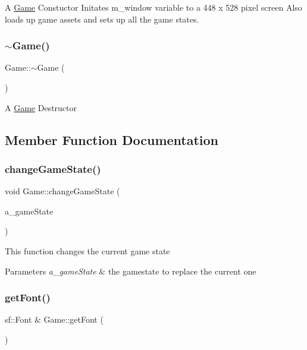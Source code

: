 A \hyperlink{class_game}{Game} Constuctor Initates m\+\_\+window variable to a 448 x 528 pixel screen Also loads up game assets and sets up all the game states. \mbox{\label{class_game_ae3d112ca6e0e55150d2fdbc704474530}} 
\subsubsection{\texorpdfstring{$\sim$\+Game()}{~Game()}}
{\footnotesize\ttfamily Game\+::$\sim$\+Game (\begin{DoxyParamCaption}{ }\end{DoxyParamCaption})}

A \hyperlink{class_game}{Game} Destructor 

\subsection{Member Function Documentation}
\mbox{\label{class_game_aead31c173174cd4251542403a9e1e111}} 
\subsubsection{\texorpdfstring{change\+Game\+State()}{changeGameState()}}
{\footnotesize\ttfamily void Game\+::change\+Game\+State (\begin{DoxyParamCaption}\item[{\hyperlink{class_game_state_a81618e0403319d48e9f25347111f8157}{Game\+State\+::\+State}}]{a\+\_\+game\+State }\end{DoxyParamCaption})}

This function changes the current game state


\begin{DoxyParams}{Parameters}
{\em a\+\_\+game\+State} & the gamestate to replace the current one \\
\hline
\end{DoxyParams}
\mbox{\label{class_game_a813ff20fa498389e4bb120090803676b}} 
\subsubsection{\texorpdfstring{get\+Font()}{getFont()}}
{\footnotesize\ttfamily sf\+::\+Font \& Game\+::get\+Font (\begin{DoxyParamCaption}{ }\end{DoxyParamCaption})}

